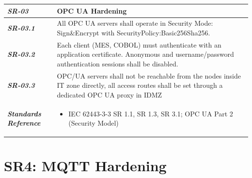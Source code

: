 \documentclass{report}
\begin{document}
\begin{tabularx}{\textwidth}{>{\bfseries}p{2.5cm} X}
    \textit{SR-03} & \textbf{OPC UA Hardening} \vspace{0.5em}\\
\toprule
\textit{SR-03.1} &
    
    All OPC UA servers shall operate in Security Mode: Sign\&Encrypt with SecurityPolicy:Basic256Sha256.
    \vspace{0.5em}
\\
\textit{SR-03.2} &
    Each client (MES, COBOL) must authenticate with an application certificate. Anonymous and username/password authentication sessions shall be disabled.
    \vspace{0.5em}
    \\
\textit{SR-03.3} &
    OPC/UA servers shall not be reachable from the nodes inside IT zone directly, all access routes shall be set through a dedicated OPC UA proxy in IDMZ
    \vspace{0.5em}
    \\
\midrule
    \textit{Standards Reference} &
\begin{itemize}[label=-, noitemsep, topsep=0pt, leftmargin=*]
    \item IEC 62443-3-3 SR 1.1, SR 1.3, SR 3.1; OPC UA Part 2 (Security Model)
\end{itemize} \vspace{1em} \\ 
\end{tabularx}
\vspace{2em}

\section{SR4: MQTT Hardening}\label{SR4:mqtt}
\end{document}
